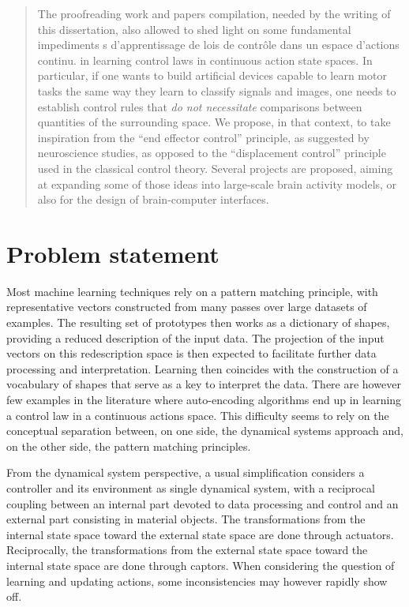 \documentclass[11pt]{article}
\begin{document}
\begin{abstract}
The proofreading work and papers compilation, needed by the writing of this dissertation, 
also allowed to shed light on some fundamental impediments 
s d'apprentissage de lois de contrôle dans un espace d'actions continu.
in learning control laws in continuous action state spaces. 
In particular, if one wants to build artificial devices capable to learn motor tasks
the same way they learn to classify signals and images, 
one needs to establish control rules that \textit{do not necessitate} comparisons between quantities
of the surrounding space.
We propose, in that context, to
take inspiration from the ``end effector control'' principle, as suggested by neuroscience studies,  
as opposed to the ``displacement control'' principle used in the classical control theory. 
Several projects are proposed, aiming at expanding some of those ideas into large-scale 
brain activity models, or also for the design of brain-computer interfaces.

\end{abstract}

\section{Problem statement}

Most machine learning techniques rely on a pattern matching principle, with representative vectors constructed from many passes over large datasets of examples.
The resulting set of prototypes then works as a dictionary of shapes, providing a reduced description of the input data. The projection of the input vectors on this redescription space is then expected to facilitate further data processing and interpretation.
Learning then coincides with the construction of a vocabulary of shapes that serve as a key to interpret the data. 
There are however few examples in the literature where auto-encoding algorithms end up in learning a control law in a continuous actions space.  
This difficulty seems to rely on the conceptual separation between, on one side, the dynamical systems approach and, on the other side, the pattern matching principles.

From the dynamical system perspective, a usual simplification considers a controller and its environment as single dynamical system, with a reciprocal coupling between an internal part devoted to data processing and control and an external part consisting in material objects. The transformations from the internal state space toward the external state space are done through actuators. Reciprocally, the transformations from the external state space toward the internal state space are done through captors. 
When considering the question of learning and updating actions, some inconsistencies may however rapidly show off. 
\end{document}
